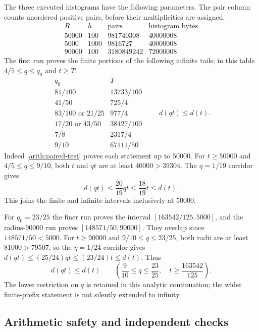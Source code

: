 \documentclass[11pt,reqno]{amsart}
\numberwithin{equation}{section}
\begin{document}
The three executed histograms have the following parameters.  The pair
column counts unordered positive pairs, before their multiplicities
are assigned.
\[
\begin{array}{r|r|r|r}
 R&h&\text{pairs}&\text{histogram bytes}\\ \hline
 50000&100&981740308&40000008\\
 5000&1000&9816727&40000008\\
 90000&100&3180849242&72000008
\end{array}
\]
The first run proves the finite portions of the following infinite
tails; in this table $4/5\le q\le q_0$ and $t\ge T$:
\begin{equation}\label{arith:paired-tail-table}
\begin{array}{c|c}
 q_0&T\\ \hline
 81/100&13733/100\\
 41/50&725/4\\
 83/100\text{ or }21/25&977/4\\
 17/20\text{ or }43/50&38427/100\\
 7/8&2317/4\\
 9/10&67111/50
\end{array}
\qquad d(qt)\le d(t).
\end{equation}
Indeed \eqref{arith:paired-test} proves each statement up to $50000$.
For $t\ge50000$ and $4/5\le q\le9/10$, both $t$ and $qt$ are at
least $40000>39304$.  The $\eta=1/19$ corridor gives
\[
 d(qt)\le\frac{20}{19}qt\le\frac{18}{19}t\le d(t).
\]
This joins the finite and infinite intervals inclusively at $50000$.

For $q_0=23/25$ the finer run proves the interval
$[163542/125,5000]$, and the radius-$90000$ run proves
$[148571/50,90000]$.  They overlap since $148571/50<5000$.
For $t\ge90000$ and $9/10\le q\le23/25$, both radii are at least
$81000>79507$, so the $\eta=1/24$ corridor gives
$d(qt)\le(25/24)qt\le(23/24)t\le d(t)$.  Thus
\begin{equation}\label{arith:paired-final-tail}
 d(qt)\le d(t)\qquad
 \left(\frac9{10}\le q\le\frac{23}{25},\quad
       t\ge\frac{163542}{125}\right).
\end{equation}
The lower restriction on $q$ is retained in this analytic continuation;
the wider finite-prefix statement is not silently extended to infinity.

\subsection{Arithmetic safety and independent checks}
\end{document}
